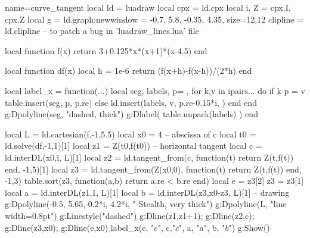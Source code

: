 \documentclass[border=5pt]{standalone}
\begin{document}
\begin{luadraw}{name=curve_tangent}
local ld = luadraw
local cpx = ld.cpx
local i, Z = cpx.I, cpx.Z
local g = ld.graph:new{window = {-0.7, 5.8, -0.35, 4.35}, size={12,12}}
clipline = ld.clipline -- to patch a bug in 'luadraw_lines.lua' file

local function f(x)
    return 3+0.125*x*(x+1)*(x-4.5)
end

local function df(x)
    local h = 1e-6
    return (f(x+h)-f(x-h))/(2*h)
end

local label_x = function(...)
    local seg, labels, p= {}, {}
    for k,v in ipairs{...} do
        if k%
            p = v
            table.insert(seg, {p, p.re})
        else
            ld.insert(labels, {v, p.re-0.15*i, {}})
        end
    end
    g:Dpolyline(seg, "dashed, thick")
    g:Dlabel( table.unpack(labels) )
end

local L = ld.cartesian(f,-1,5.5)
local x0 = 4 -- abscissa of c
local t0 = ld.solve(df,-1,1)[1]
local z1 = Z(t0,f(t0)) -- horizontal tangent
local c = ld.interDL({x0,i}, L)[1]
local z2 = ld.tangent_from(c, function(t) return Z(t,f(t)) end, -1,5)[1]
local z3 = ld.tangent_from(Z(x0,0), function(t) return Z(t,f(t)) end, -1,3)
table.sort(z3, function(a,b) return a.re < b.re end)
local e = z3[2]
z3 = z3[1]
local a = ld.interDL({z1,1}, L)[1]
local b = ld.interDL({z3,x0-z3}, L)[1]
-- drawing
g:Dpolyline({{-0.5, 5.65},{-0.2*i, 4.2*i}}, "-Stealth, very thick")
g:Dpolyline(L, "line width=0.8pt")
g:Linestyle("dashed")
g:Dline(z1,z1+1); g:Dline(z2,c); g:Dline(z3,x0); g:Dline(e,x0)
label_x(e, "$e$", c,"$c$", a, "$a$", b, "$b$") 
g:Show()
\end{luadraw}
\end{document}
